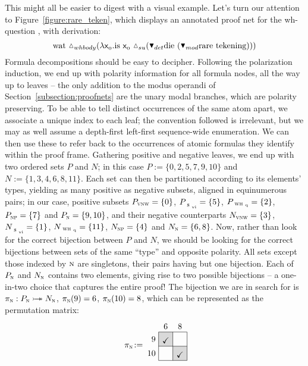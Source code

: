This might all be easier to digest with a visual example.
Let's turn our attention to Figure~\ref{figure:rare_teken}, which displays an annotated proof net for the wh-question , with derivation:
\begin{equation}
	\w{wat}~\ddiaintro{whbody}(\lam \Var{0}.\w{is}~\Var{0}~\ddiaintro{su}(\dboxelim{det}\w{die}~(\dboxelim{mod}\w{rare}~\w{tekening})))
\end{equation}
Formula decompositions should be easy to decipher.
Following the polarization induction, we end up with polarity information for all formula nodes, all the way up to leaves -- the only addition to the modus operandi of  Section~\ref{subsection:proofnets} are the unary modal branches, which are polarity preserving.
To be able to tell distinct occurrences of the same atom apart, we associate a unique index to each leaf; the convention followed is irrelevant, but we may as well assume a depth-first left-first sequence-wide enumeration.
We can then use these to refer back to the occurrences of atomic formulas they identify within the proof frame.
Gathering positive and negative leaves, we end up with two ordered sets $P$ and $N$; in this case $P := \{ 0, 2, 5, 7, 9, 10\}$ and $N := \{ 1,3,4,6,8,11\}$.
Each set can then be partitioned according to its elements' types, yielding as many positive as negative subsets, aligned in equinumerous pairs; in our case, positive subsets $P_{\vnw[s]} = \{ 0 \}$, $P_{\svi[s]} = \{5 \}$, $P_{\whq[s]} = \{2\}$, $P_{\np[s]} = \{ 7 \}$  and $P_{\n[s]} = \{ 9, 10 \}$, and their negative counterparts $N_{\vnw[s]} = \{3\}$, $N_{\svi[s]} =\{1 \}$, $N_{\whq[s]} = \{ 11 \}$, $N_{\np[s]} = \{4\}$  and $N_{\n[s]} = \{ 6, 8\}$.
Now, rather than look for the correct bijection between $P$ and $N$, we should be looking for the correct bijections between sets of the same ``type'' and opposite polarity.
All sets except those indexed by $\n[s]$ are singletons, their pairs having but one bijection.
Each of $P_{\n[s]}$ and $N_{\n[s]}$ contains two elements, giving rise to two possible bijections -- a one-in-two choice that captures the entire proof!
The bijection we are in search for is $\pi_{\n[s]} : P_{\n[s]} \biject N_{\n[s]}$, $\pi_{\n[s]}(9)=6$, $\pi_{\n[s]}(10)=8$, which can be represented as the permutation matrix:
\begin{equation}
\begin{tikzpicture}[scale=.6]
    \fill[gray!30] (0,1) rectangle +(1,1);
    \node [above] at (0.5, 1) {\checkmark};
    \fill[gray!30] (1,0) rectangle +(1,1);
    \node [above] at (1.5, 0) {\checkmark};
    \node [above] at (0.5,2) {6};
    \node [above] at (1.5,2) {8};
    \node [left] at (0,1.5) {9};
    \node [left] at (0,0.5) {10};
    \node at (-1.75,1) {${\pi}_{\n[s]}\!:=$};
    \draw (0,0) grid (2,2);
\end{tikzpicture}
\end{equation}

